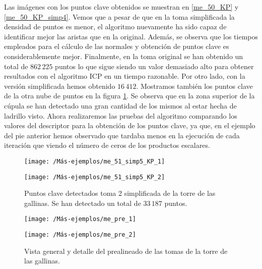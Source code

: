 Las imágenes con los puntos clave obtenidos se muestran en \ref{me_50_KP} y \ref{me_50_KP_simp4}. Vemos que a pesar de que en la toma simplificada la densidad de puntos es menor, el algoritmo nuevamente ha sido capaz de identificar mejor las aristas que en la original. Además, se observa que los tiempos empleados para el cálculo de las normales y obtención de puntos clave es considerablemente mejor. Finalmente, en la toma original se han obtenido un total de $ 862\,225 $ puntos lo que sigue siendo un valor demasiado alto para obtener resultados con el algoritmo ICP en un tiempo razonable. Por otro lado, con la versión simplificada hemos obtenido $16\,412 $. Mostramos también los puntos clave de la otra nube de puntos en la figura \ref{me_51_KP_simp4}. Se observa que en la zona superior de la cúpula se han detectado una gran cantidad de los mismos al estar hecha de ladrillo visto. Ahora realizaremos las pruebas del algoritmo comparando los valores del descriptor para la obtención de los puntos clave, ya que, en el ejemplo del pie anterior hemos observado que tardaba menos en la ejecución de cada iteración que viendo el número de ceros de los productos escalares. \\

\begin{figure}[h!]	
	\begin{minipage}[b]{0.5\textwidth}
		\centering		
		\texttt{[image: /Más-ejemplos/me\_51\_simp5\_KP\_1]} 
	\end{minipage}
	\begin{minipage}[b]{0.5\textwidth}
		\texttt{[image: /Más-ejemplos/me\_51\_simp5\_KP\_2]}
	\end{minipage}
	\caption{Puntos clave detectados toma 2 simplificada de la torre de las gallinas. Se han detectado un total de $ 33\,187 $ puntos.}
	\label{me_51_KP_simp4}
\end{figure}


\begin{figure}[h!]	
	\begin{minipage}[b]{0.5\textwidth}
		\centering		
		\texttt{[image: /Más-ejemplos/me\_pre\_1]} 
	\end{minipage}
	\begin{minipage}[b]{0.5\textwidth}
		\centering
		\texttt{[image: /Más-ejemplos/me\_pre\_2]}
	\end{minipage}
	\caption{Vista general y detalle del prealineado de las tomas de la torre de las gallinas.}
	\label{fig:ICPtorrePre}
\end{figure}


